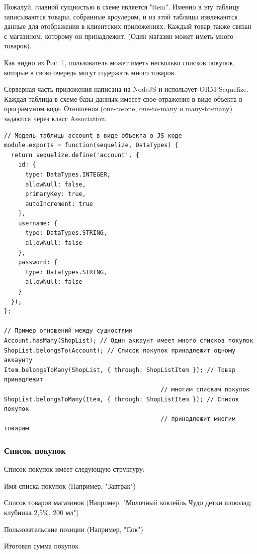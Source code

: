 Пожалуй, главной сущностью в схеме является "item". Именно в эту таблицу
записываются товары, собранные кроулером, и из этой таблицы извлекаются данные
для отображения в клиентских приложениях. Каждый товар также связан с
магазином, которому он принадлежит. (Один магазин может иметь много товаров).

Как видно из Рис. 1, пользователь может иметь несколько списков покупок,
которые в свою очередь могут содержать много товаров.

Серверная часть приложения написана на NodeJS и использует ORM Sequelize.
Каждая таблица в схеме базы данных имееет свое отражение в виде объекта в
программном коде. Отношения (one-to-one, one-to-many и many-to-many) задаются
через класс Association. \cite{sequelize}

\begin{verbatim}
// Модель таблицы account в виде объекта в JS коде
module.exports = function(sequelize, DataTypes) {
  return sequelize.define('account', {
    id: {
      type: DataTypes.INTEGER,
      allowNull: false,
      primaryKey: true,
      autoIncrement: true
    },
    username: {
      type: DataTypes.STRING,
      allowNull: false
    },
    password: {
      type: DataTypes.STRING,
      allowNull: false
    }
  });
};

// Пример отношений между сущностями
Account.hasMany(ShopList); // Один аккаунт имеет много списков покупок
ShopList.belongsTo(Account); // Список покупок принадлежит одному аккаунту
Item.belongsToMany(ShopList, { through: ShopListItem }); // Товар принадлежит
                                            // многим спискам покупок
ShopList.belongsToMany(Item, { through: ShopListItem }); // Список покупок
                                            // принадлежит многим товарам
\end{verbatim}


\subsubsection{Список покупок}
Список покупок имеет следующую структуру:
\begin{my_enumerate}
  \item Имя списка покупок (Например, "Завтрак")
  \item Список товаров магазинов (Например, "Молочный коктейль Чудо детки
    шоколад; клубника 2,5\%, 200 мл")
  \item Пользовательские позиции (Например, "Сок")
  \item Итоговая сумма покупок
\end{my_enumerate}

